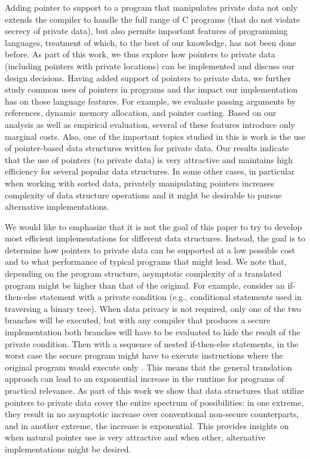 \documentclass[11pt]{article}
\begin{document}
Adding pointer to support to a program that manipulates private data not
only extends the compiler to handle the full range of C programs (that do
not violate secrecy of private data), but also permits important features of
programming languages, treatment of which, to the best of our knowledge, has
not been done before. As part of this work, we thus explore how pointers to
private data (including pointers with private locations) can be implemented
and discuss our design decisions. Having added support of
pointers to private data, we further study common uses of pointers in
programs and the impact our implementation has on those language features.
For example, we evaluate passing arguments by references, dynamic memory
allocation, and pointer casting. Based on our analysis as well as empirical
evaluation, several of these features introduce only marginal costs. Also, one
of the important topics studied in this is work is the use of pointer-based
data structures written for private data. Our results indicate that the use
of pointers (to private data) is very attractive and maintains high
efficiency for several popular data structures. In some other cases, in
particular when working with sorted data, privately manipulating pointers
increases complexity of data structure operations and it might be desirable
to pursue alternative implementations. 

We would like to emphasize that it is not the goal of this paper to try to
develop most efficient implementations for different data structures.
Instead, the goal is to determine how pointers to private data can be
supported at a low possible cost and to what performance of typical
programs that might lead. We note that, depending on the program structure,
asymptotic complexity of a translated program might be higher than that of
the original. For example, consider an if-then-else statement with a private
condition (e.g., conditional statements used in traversing a binary tree).
When data privacy is not required, only one of the two branches will be
executed, but with any compiler that produces a secure implementation both
branches will have to be evaluated to hide the result of the private
condition. Then with a sequence of  nested if-then-else statements, in
the worst case the secure program might have to execute 
instructions where the original program would execute only . This
means that the general translation approach can lead to an exponential
increase in the runtime for programs of practical relevance. As part of this
work we show that data structures that utilize pointers to private data
cover the entire spectrum of possibilities: in one extreme, they result in
no asymptotic increase over conventional non-secure counterparts, and in
another extreme, the increase is exponential. This provides insights on when
natural pointer use is very attractive and when other, alternative
implementations might be desired.
\end{document}
